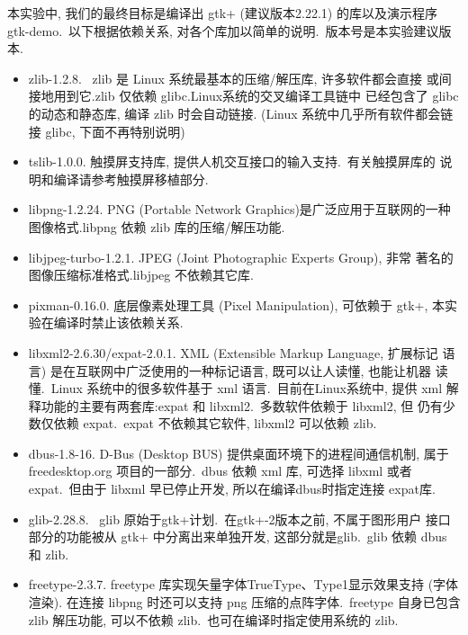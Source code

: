 本实验中, 我们的最终目标是编译出 gtk+ (建议版本2.22.1) 的库以及演示程序
gtk-demo.~以下根据依赖关系, 对各个库加以简单的说明.~版本号是本实验建议版本.
\begin{itemize}
  \item zlib-1.2.8. \ zlib 是 Linux 系统最基本的压缩/解压库, 许多软件都会直接
      或间接地用到它.\@ zlib 仅依赖 glibc. Linux系统的交叉编译工具链中
      已经包含了 glibc 的动态和静态库, 编译 zlib 时会自动链接.
      (Linux 系统中几乎所有软件都会链接 glibc, 下面不再特别说明)

  \item tslib-1.0.0. 触摸屏支持库, 提供人机交互接口的输入支持.~有关触摸屏库的
      说明和编译请参考触摸屏移植部分.

  \item libpng-1.2.24. PNG (Portable Network Graphics)是广泛应用于互联网的一种
      图像格式.\@ libpng 依赖 zlib 库的压缩/解压功能.

  \item libjpeg-turbo-1.2.1. JPEG (Joint Photographic Experts Group), 非常
      著名的图像压缩标准格式.libjpeg 不依赖其它库.

  \item pixman-0.16.0. 底层像素处理工具 (Pixel Manipulation), 可依赖于 gtk+,
      本实验在编译时禁止该依赖关系.

  \item libxml2-2.6.30/expat-2.0.1. XML (Extensible Markup Language, 扩展标记
      语言) 是在互联网中广泛使用的一种标记语言, 既可以让人读懂, 也能让机器
      读懂.~Linux 系统中的很多软件基于 xml 语言.~目前在Linux系统中, 提供 xml
      解释功能的主要有两套库:expat 和 libxml2.~多数软件依赖于 libxml2, 但
      仍有少数仅依赖 expat.~expat 不依赖其它软件, libxml2 可以依赖 zlib.

  \item dbus-1.8-16. D-Bus (Desktop BUS) 提供桌面环境下的进程间通信机制, 属于
      freedesktop.org 项目的一部分.~dbus 依赖 xml 库, 可选择 libxml 或者
      expat.~但由于 libxml 早已停止开发, 所以在编译dbus时指定连接 expat库.

  \item glib-2.28.8. \ glib 原始于gtk+计划.~在gtk+-2版本之前, 不属于图形用户
      接口部分的功能被从 gtk+ 中分离出来单独开发, 这部分就是glib.~glib 依赖
      dbus 和 zlib.

  \item freetype-2.3.7. freetype 库实现矢量字体TrueType、Type1显示效果支持
      (字体渲染). 在连接 libpng 时还可以支持 png 压缩的点阵字体.~freetype
      自身已包含 zlib 解压功能, 可以不依赖 zlib.~也可在编译时指定使用系统的
      zlib.


\end{itemize}
